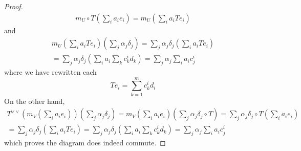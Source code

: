 \documentclass{article}
\begin{document}
\begin{proof}
    \begin{align*}
        m_U\circ T(\sum_i a_i e_i)=m_U(\sum_i a_i Te_i)
    \end{align*}
    and
    \begin{align*}
        m_U(\sum_i a_i Te_i)(\sum_j \alpha_j \delta_j)=\sum_j\alpha_j \delta_j(\sum_i a_i Te_i)\\
        =\sum_j \alpha_j\delta_j(\sum_i a_i \sum_k c_k^i d_k)=\sum_j \alpha_j \sum_i a_i c^i_j
    \end{align*}
    where we have rewritten each
    \[
    Te_i=\sum_{k=1}^m c^i_k d_i
    \]
    On the other hand,
    \begin{align*}
        T^{\lor \lor}(m_V(\sum_i a_i e_i))(\sum_j \alpha_j \delta_j)=m_V(\sum_i a_ie_i)(\sum_j \alpha_j \delta_j\circ T)
        =\sum_j \alpha_j \delta_j \circ T(\sum_i a_ie_i)\\
        =\sum_j \alpha_j \delta_j (\sum_i a_i Te_i)=\sum_j \alpha_j\delta_j (\sum_i a_i \sum_k c^i_k d_k)=\sum_j \alpha_j \sum_i a_i c^i_j
    \end{align*}
    which proves the diagram does indeed commute.
\end{proof}
\end{document}
